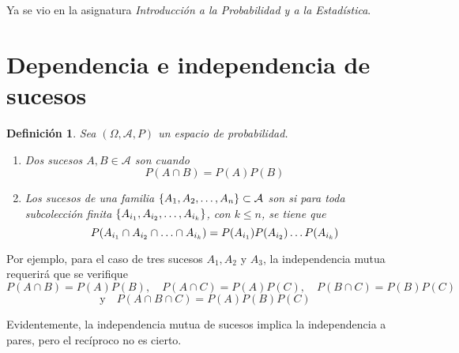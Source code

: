 \documentclass[11pt]{report}
\makeatletter
\renewenvironment{proof}[1][\proofname]{\par
  \pushQED{\qed}%
  \normalfont \topsep\z@skip %
  \trivlist
  \item[\hskip\labelsep
        \itshape
    #1\@addpunct{.}]\ignorespaces
}{%
  \popQED\endtrivlist\@endpefalse
}
\theoremstyle{mytheorem}
\theoremstyle{mydefinition}
\newtheorem{definition}{Definición}
\theoremstyle{myexample}
\let\oldproofname=\proofname
\renewcommand{\proofname}{\rm\bf{\oldproofname}}}
\newenvironment{cdefinition} %
  {\begin{mdframed}[
        linewidth=3pt,
        linecolor=c1,
        bottomline=false,
        topline=false,
        rightline=false,
        innerrightmargin=0pt,
        innertopmargin=0pt,
        innerbottommargin=0pt,
        innerleftmargin=1em,
        skipabove=\baselineskip]
    \begin{definition}}
  {\end{definition}\end{mdframed}}
\newcommand{\mybf}[1]{\boldmath\textbf{\color{c1}#1}\unboldmath} %
\makeatother
\begin{document}
\begin{proof}
Ya se vio en la asignatura \textit{Introducción a la Probabilidad y a la Estadística}.
\end{proof}

\section{Dependencia e independencia de sucesos}

\begin{cdefinition}
Sea $(\Omega, \mathcal{A}, P)$ un espacio de probabilidad.
\begin{enumerate}
    \item Dos sucesos $A,B \in \mathcal{A}$ son \mybf{{independientes}} cuando 
    \[P(A \cap B) = P(A)P(B)\]
    \item Los sucesos de una familia $\{A_1,A_2,\mathellipsis,A_n\} \subset \mathcal{A}$ son \mybf{{mutuamente independientes}} si para toda subcolección finita $\{A_{i_1},A_{i_2},\mathellipsis,A_{i_k}\}$, con $k \leq n$, se tiene que
    \[P(A_{i_1} \cap A_{i_2} \cap \mathellipsis \cap A_{i_k}) = P(A_{i_1})P(A_{i_2})\mathellipsis P(A_{i_k})\]
\end{enumerate}
\end{cdefinition}

Por ejemplo, para el caso de tres sucesos $A_1,A_2$ y $A_3$, la independencia mutua requerirá que se verifique
\[P(A \cap B) = P(A)P(B), \quad P(A \cap C) = P(A)P(C), \quad P(B \cap C) =P(B)P(C)\]
\[\text{y} \quad P(A\cap B \cap C) =P(A)P(B)P(C)\]

Evidentemente, la independencia mutua de sucesos implica la independencia a pares, pero el recíproco no es cierto. 
\end{document}
